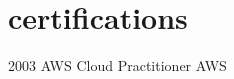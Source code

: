 \section{certifications}

\begin{entrylist}
	\certentry
	{2003}
	{AWS Cloud Practitioner}
	{AWS}
\end{entrylist}
